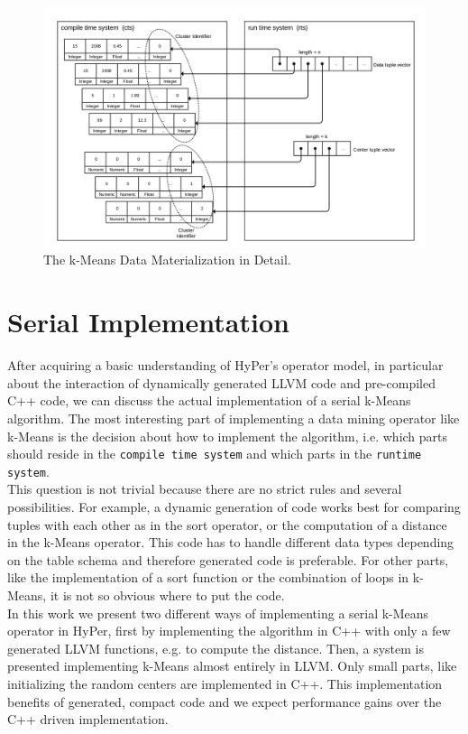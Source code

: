 \begin{figure}[htsb]
  \centerline{
  \includegraphics[scale=0.215]{figures/mat3_font2}}
  \caption[The k-Means Data Materialization in Detail]{The k-Means Data Materialization in Detail.}
  \label{fig:mat3}
\end{figure}




\section{Serial Implementation}\label{section:serial_implementation}

After acquiring a basic understanding of HyPer’s operator model, in particular about the interaction of dynamically generated LLVM code and pre-compiled C++ code, we can discuss the actual implementation of a serial k-Means algorithm. The most interesting part of implementing a data mining operator like k-Means is the decision about how to implement the algorithm, i.e. which parts should reside in the \texttt{compile time system} and which parts in the \texttt{runtime system}. 
\\
This question is not trivial because there are no strict rules and several possibilities. For example, a dynamic generation of code works best for comparing tuples with each other as in the sort operator, or the computation of a distance in the k-Means operator. This code has to handle different data types depending on the table schema and therefore generated code is preferable. For other parts, like the implementation of a sort function or the combination of loops in k-Means, it is not so obvious where to put the code.
\\
In this work we present two different ways of implementing a serial k-Means operator in HyPer, first by implementing the algorithm in C++ with only a few generated LLVM functions, e.g. to compute the distance. Then, a system is presented implementing k-Means almost entirely in LLVM. Only small parts, like initializing the random centers are implemented in C++. This implementation benefits of generated, compact code and we expect performance gains over the C++ driven implementation.


